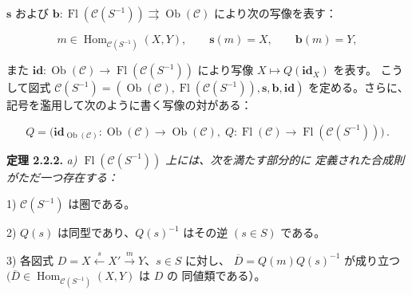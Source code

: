 \clearpage
{}%
\begingroup
\small
\setlength{\emergencystretch}{1.5em}%
\setlength{\abovedisplayskip}{1pt plus 1pt minus 1pt}%
\setlength{\belowdisplayskip}{1pt plus 1pt minus 1pt}%

\noindent $\mathbf{s}$ および $\mathbf{b}\colon
\operatorname{Fl}(\mathcal C(S^{-1}))\rightrightarrows
\operatorname{Ob}(\mathcal C)$ により次の写像を表す：

\[
  m\in\operatorname{Hom}_{\mathcal C(S^{-1})}(X,Y),\qquad
  \mathbf{s}(m)=X,\qquad \mathbf{b}(m)=Y,
\]

\noindent また $\mathbf{id}\colon\operatorname{Ob}(\mathcal C)
\to\operatorname{Fl}(\mathcal C(S^{-1}))$ により写像
$X\mapsto Q(\mathbf{id}_X)$ を表す。
%
こうして図式
$\mathcal C(S^{-1})=(\operatorname{Ob}(\mathcal C),
\operatorname{Fl}(\mathcal C(S^{-1})),\mathbf{s},\mathbf{b},\mathbf{id})$
を定める。さらに、記号を濫用して次のように書く写像の対がある：

\[
  Q=\bigl(\mathbf{id}_{\operatorname{Ob}(\mathcal C)}\colon
  \operatorname{Ob}(\mathcal C)\to\operatorname{Ob}(\mathcal C),\;
  Q\colon\operatorname{Fl}(\mathcal C)\to
  \operatorname{Fl}(\mathcal C(S^{-1}))\bigr)\,.
\]

\smallskip
\noindent\textbf{定理 2.2.2.}\quad
\begingroup\itshape
{}%
a) $\operatorname{Fl}(\mathcal C(S^{-1}))$ 上には、次を満たす部分的に
定義された合成則がただ一つ存在する：

\par\noindent\hspace*{2em}1) $\mathcal C(S^{-1})$ は圏である。

\par\noindent\hspace*{2em}2) $Q(s)$ は同型であり、$Q(s)^{-1}$ はその逆
$(s\in S)$ である。

\par\noindent\hspace*{2em}3) 各図式
$D=X\xleftarrow{s}X'\xrightarrow{m}Y$、$s\in S$ に対し、
$\overline D=Q(m)Q(s)^{-1}$ が成り立つ
$(\overline D\in\operatorname{Hom}_{\mathcal C(S^{-1})}(X,Y)$ は $D$ の
同値類である）。

